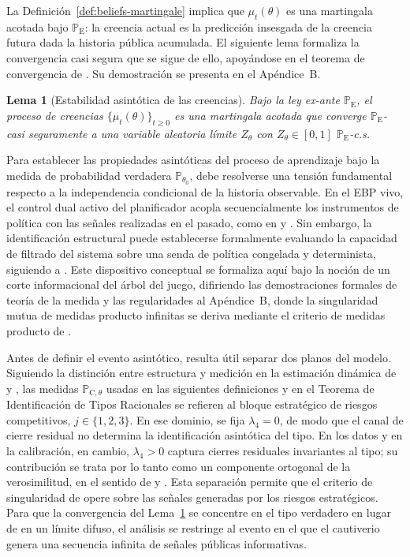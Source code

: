 \documentclass[pdflatex,sn-mathphys-ay]{sn-jnl}
\theoremstyle{thmstyleone}
\newtheorem{lemma}[theorem]{Lema}
\theoremstyle{thmstyletwo}
\theoremstyle{thmstylethree}
\newcommand{\ProbE}{\mathbb{P}_{\mathrm{E}}}
\newcommand{\ProbC}[1]{\mathbb{P}_{\mathrm{C},#1}}
\newcommand{\1}{\mathbf{1}}
\begin{document}
La Definición~\ref{def:beliefs-martingale} implica que $\mu_t(\theta)$ es una martingala acotada bajo $\ProbE$: la creencia actual es la predicción insesgada de la creencia futura dada la historia pública acumulada. El siguiente lema formaliza la convergencia casi segura que se sigue de ello, apoyándose en el teorema de convergencia de \citet{Doob1953Stochastic}. Su demostración se presenta en el Apéndice~B.

\begin{lemma}[Estabilidad asintótica de las creencias]\label{lem:asymptotic-beliefs}
Bajo la ley ex-ante $\ProbE$, el proceso de creencias $\{\mu_t(\theta)\}_{t\ge 0}$ es una martingala acotada que converge $\ProbE$-casi seguramente a una variable aleatoria límite $Z_\theta$ con $Z_\theta\in[0,1]$ $\ProbE$-c.s.
\end{lemma}

\smallskip

Para establecer las propiedades asintóticas del proceso de aprendizaje bajo la medida de probabilidad verdadera $\mathbb{P}_{\theta_0}$, debe resolverse una tensión fundamental respecto a la independencia condicional de la historia observable. En el EBP vivo, el control dual activo del planificador acopla secuencialmente los instrumentos de política con las señales realizadas en el pasado, como en \citet{AghionBoltonHarrisJullien1991} y \citet{EasleyKiefer1988}. Sin embargo, la identificación estructural puede establecerse formalmente evaluando la capacidad de filtrado del sistema sobre una senda de política congelada y determinista, siguiendo a \citet{BlackwellDubins1962}. Este dispositivo conceptual se formaliza aquí bajo la noción de un corte informacional del árbol del juego, difiriendo las demostraciones formales de teoría de la medida y las regularidades al Apéndice~B, donde la singularidad mutua de medidas producto infinitas se deriva mediante el criterio de medidas producto de \citet{Kakutani1948}.

Antes de definir el evento asintótico, resulta útil separar dos planos del modelo. Siguiendo la distinción entre estructura y medición en la estimación dinámica de \citet{Rust1987} y \citet{MagnacThesmar2002}, las medidas $\ProbC{\theta}$ usadas en las siguientes definiciones y en el Teorema de Identificación de Tipos Racionales se refieren al bloque estratégico de riesgos competitivos, $j\in\{1,2,3\}$. En ese dominio, se fija $\lambda_4=0$, de modo que el canal de cierre residual no determina la identificación asintótica del tipo. En los datos y en la calibración, en cambio, $\lambda_4>0$ captura cierres residuales invariantes al tipo; su contribución se trata por lo tanto como un componente ortogonal de la verosimilitud, en el sentido de \citet{Lancaster1990} y \citet{AbbringVanDenBerg2003}. Esta separación permite que el criterio de singularidad de \citet{Kakutani1948} opere sobre las señales generadas por los riesgos estratégicos. Para que la convergencia del Lema~\ref{lem:asymptotic-beliefs} se concentre en el tipo verdadero en lugar de en un límite difuso, el análisis se restringe al evento en el que el cautiverio genera una secuencia infinita de señales públicas informativas.
\end{document}
